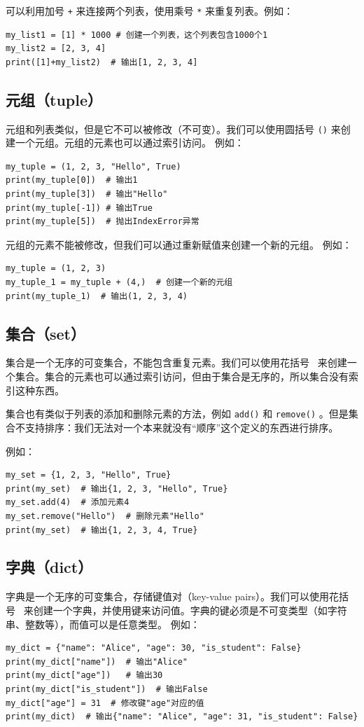 可以利用加号 \texttt{+} 来连接两个列表，使用乘号 \texttt{*} 来重复列表。例如：
\begin{verbatim}
my_list1 = [1] * 1000 # 创建一个列表，这个列表包含1000个1
my_list2 = [2, 3, 4]
print([1]+my_list2)  # 输出[1, 2, 3, 4]
\end{verbatim}

\subsection{元组（tuple）}
元组和列表类似，但是它不可以被修改（不可变）。我们可以使用圆括号 \texttt{()} 来创建一个元组。元组的元素也可以通过索引访问。
例如：
\begin{verbatim}
my_tuple = (1, 2, 3, "Hello", True)
print(my_tuple[0])  # 输出1
print(my_tuple[3])  # 输出"Hello"
print(my_tuple[-1]) # 输出True
print(my_tuple[5])  # 抛出IndexError异常
\end{verbatim}

元组的元素不能被修改，但我们可以通过重新赋值来创建一个新的元组。
例如：
\begin{verbatim}
my_tuple = (1, 2, 3)
my_tuple_1 = my_tuple + (4,)  # 创建一个新的元组
print(my_tuple_1)  # 输出(1, 2, 3, 4)
\end{verbatim}

\subsection{集合（set）}
集合是一个无序的可变集合，不能包含重复元素。我们可以使用花括号 \texttt{{} }来创建一个集合。集合的元素也可以通过索引访问，但由于集合是无序的，所以集合没有索引这种东西。

集合也有类似于列表的添加和删除元素的方法，例如 \texttt{add()} 和 \texttt{remove()} 。但是集合不支持排序：我们无法对一个本来就没有“顺序”这个定义的东西进行排序。

例如：
\begin{verbatim}
my_set = {1, 2, 3, "Hello", True}
print(my_set)  # 输出{1, 2, 3, "Hello", True}
my_set.add(4)  # 添加元素4
my_set.remove("Hello")  # 删除元素"Hello"
print(my_set)  # 输出{1, 2, 3, 4, True}
\end{verbatim}

\subsection{字典（dict）}
字典是一个无序的可变集合，存储键值对（key-value
pairs）。我们可以使用花括号 \texttt{{} }来创建一个字典，并使用键来访问值。字典的键必须是不可变类型（如字符串、整数等），而值可以是任意类型。
例如：
\begin{verbatim}
my_dict = {"name": "Alice", "age": 30, "is_student": False}
print(my_dict["name"])  # 输出"Alice"
print(my_dict["age"])   # 输出30
print(my_dict["is_student"])  # 输出False
my_dict["age"] = 31  # 修改键"age"对应的值
print(my_dict)  # 输出{"name": "Alice", "age": 31, "is_student": False}
\end{verbatim}

